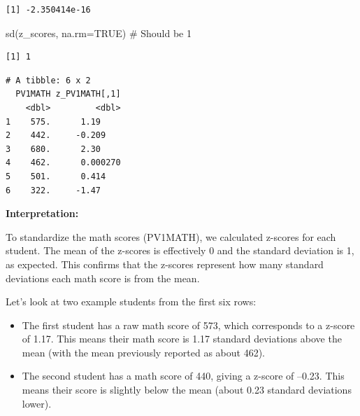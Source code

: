 \documentclass[
  letterpaper,
  DIV=11,
  numbers=noendperiod]{scrreprt}
\newenvironment{Shaded}{\begin{snugshade}}{\end{snugshade}}
\newcommand{\AttributeTok}[1]{\textcolor[rgb]{0.40,0.45,0.13}{#1}}
\newcommand{\CommentTok}[1]{\textcolor[rgb]{0.37,0.37,0.37}{#1}}
\newcommand{\ConstantTok}[1]{\textcolor[rgb]{0.56,0.35,0.01}{#1}}
\newcommand{\FunctionTok}[1]{\textcolor[rgb]{0.28,0.35,0.67}{#1}}
\newcommand{\NormalTok}[1]{\textcolor[rgb]{0.00,0.23,0.31}{#1}}
\newcommand{\OtherTok}[1]{\textcolor[rgb]{0.00,0.23,0.31}{#1}}
\newcommand{\SpecialCharTok}[1]{\textcolor[rgb]{0.37,0.37,0.37}{#1}}
\newcommand{\StringTok}[1]{\textcolor[rgb]{0.13,0.47,0.30}{#1}}
\begin{document}
\begin{verbatim}
[1] -2.350414e-16
\end{verbatim}

\begin{Shaded}
\begin{Highlighting}[]
\FunctionTok{sd}\NormalTok{(z\_scores, }\AttributeTok{na.rm=}\ConstantTok{TRUE}\NormalTok{)        }\CommentTok{\# Should be 1 }
\end{Highlighting}
\end{Shaded}

\begin{verbatim}
[1] 1
\end{verbatim}

\begin{Shaded}
\end{Shaded}

\begin{verbatim}
# A tibble: 6 x 2
  PV1MATH z_PV1MATH[,1]
    <dbl>         <dbl>
1    575.      1.19    
2    442.     -0.209   
3    680.      2.30    
4    462.      0.000270
5    501.      0.414   
6    322.     -1.47    
\end{verbatim}

\textbf{Interpretation:}

To standardize the math scores (PV1MATH), we calculated z-scores for
each student. The mean of the z-scores is effectively 0 and the standard
deviation is 1, as expected. This confirms that the z-scores represent
how many standard deviations each math score is from the mean.

Let's look at two example students from the first six rows:

\begin{itemize}
\item
  The first student has a raw math score of 573, which corresponds to a
  z-score of 1.17. This means their math score is 1.17 standard
  deviations above the mean (with the mean previously reported as about
  462).
\item
  The second student has a math score of 440, giving a z-score of
  --0.23. This means their score is slightly below the mean (about 0.23
  standard deviations lower).
\end{itemize}
\end{document}
